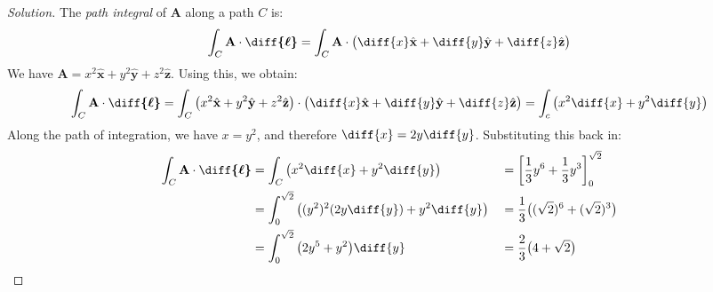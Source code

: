 \documentclass[crop=false,class=article,oneside]{standalone}
\begin{document}
        \begin{proof}[Solution]
            The \textit{path integral} of $\mathbf{A}$
            along a path $C$ is:
            \begin{equation*}
                \int_{C}\mathbf{A}\cdot\boldsymbol{\diff{\ell}}
                =\int_{C}\mathbf{A}\cdot\big(
                    \diff{x}\hat{\mathbf{x}}
                   +\diff{y}\hat{\mathbf{y}}
                   +\diff{z}\hat{\mathbf{z}}
                \big)
            \end{equation*}
            We have
            $\mathbf{A}%
             =x^{2}\hat{\mathbf{x}}%
             +y^{2}\hat{\mathbf{y}}%
             +z^{2}\hat{\mathbf{z}}$.
            Using this, we obtain:
            \begin{equation*}
                \int_{C}\mathbf{A}\cdot\boldsymbol{\diff{\ell}}
                =\int_{C}\big(
                    x^{2}\hat{\mathbf{x}}+y^{2}
                    \hat{\mathbf{y}}+z^{2}\hat{\mathbf{z}}
                \big)
                \cdot\big(
                     \diff{x}\hat{\mathbf{x}}
                    +\diff{y}\hat{\mathbf{y}}
                    +\diff{z}\hat{\mathbf{z}}
                \big)
                =\int_{c}\big(x^{2}\diff{x}+y^{2}\diff{y}\big)
            \end{equation*}
            Along the path of integration, we have $x=y^{2}$,
            and therefore $\diff{x}=2y\diff{y}$.
            Substituting this back in:
            \begin{align*}
                \int_{C}\mathbf{A}\cdot\boldsymbol{\diff{\ell}}
                &=\int_{C}\big(x^{2}\diff{x}+y^{2}\diff{y}\big)
                &
                &=\bigg[
                     \frac{1}{3}y^{6}
                    +\frac{1}{3}y^{3}
                \bigg]_{0}^{\sqrt{2}}\\
                &=\int_{0}^{\sqrt{2}}
                  \big((y^{2})^{2}(2y\diff{y})+y^{2}\diff{y}\big)
                &
                &=\frac{1}{3}\big(
                    (\sqrt{2})^{6}+(\sqrt{2})^{3}
                \big)\\
                &=\int_{0}^{\sqrt{2}}
                  \big(2y^{5}+y^{2}\big)\diff{y}
                &
                &=\frac{2}{3}\big(4+\sqrt{2}\big)\\
            \end{align*}
        \end{proof}
\end{document}
